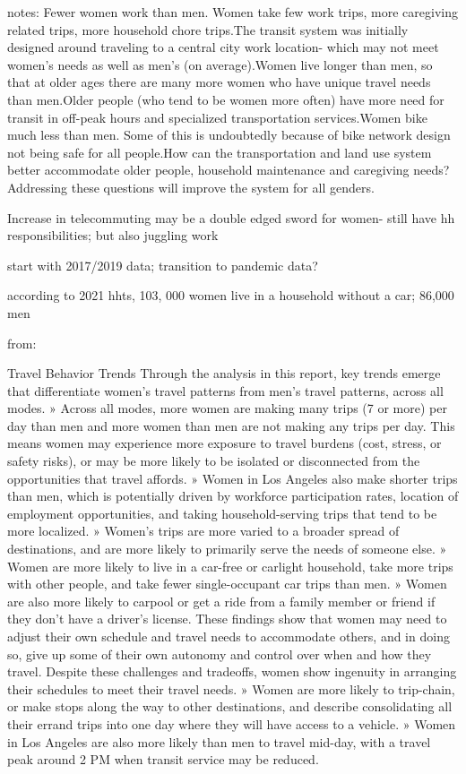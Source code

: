 \documentclass[
  12pt,
]{article}
\begin{document}
\begin{flushleft}
\begin{flushleft}
notes: 
Fewer women work than men. Women take few work trips, more caregiving related trips, more household chore trips.The transit system was initially designed around traveling to a central city work location- which may not meet women's needs as well as men's (on average).Women live longer than men, so that at older ages there are many more women who have unique travel needs than men.Older people (who tend to be women more often) have more need for transit in off-peak hours and specialized transportation services.Women bike much less than men. Some of this is undoubtedly because of bike network design not being safe for all people.How can the transportation and land use system better accommodate older people, household maintenance and caregiving needs? Addressing these questions will improve the system for all genders.


Increase in telecommuting may be a double edged sword for women- still have hh responsibilities; but also juggling work



start with 2017/2019 data; transition to pandemic data?


according to 2021 hhts, 103, 000 women live in a household without a car; 86,000 men

from: 

Travel Behavior Trends
Through the analysis in this report, key trends
emerge that differentiate women’s travel patterns
from men’s travel patterns, across all modes. » Across all modes, more women are making many
trips (7 or more) per day than men and more
women than men are not making any trips per day.
This means women may experience more exposure
to travel burdens (cost, stress, or safety risks), or
may be more likely to be isolated or disconnected
from the opportunities that travel affords.
» Women in Los Angeles also make shorter trips
than men, which is potentially driven by workforce
participation rates, location of employment
opportunities, and taking household-serving trips
that tend to be more localized.
» Women’s trips are more varied to a broader spread
of destinations, and are more likely to primarily
serve the needs of someone else.
» Women are more likely to live in a car-free or carlight household, take more trips with other people,
and take fewer single-occupant car trips than men.
» Women are also more likely to carpool or get a ride
from a family member or friend if they don’t have
a driver’s license.
These findings show that women may need to adjust
their own schedule and travel needs to accommodate
others, and in doing so, give up some of their own
autonomy and control over when and how they travel.
Despite these challenges and tradeoffs,
women show ingenuity in arranging their
schedules to meet their travel needs. » Women are more likely to trip-chain, or make
stops along the way to other destinations, and
describe consolidating all their errand trips into
one day where they will have access to a vehicle.
» Women in Los Angeles are also more likely than
men to travel mid-day, with a travel peak around 2
PM when transit service may be reduced.


\end{flushleft}
\end{flushleft}
\end{document}
